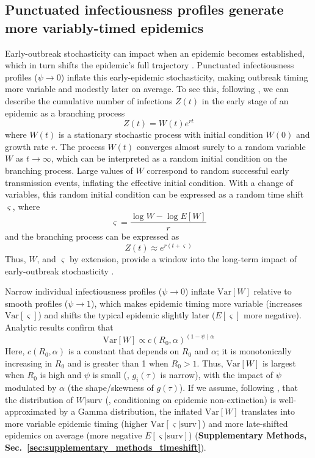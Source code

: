 \subsection{Punctuated infectiousness profiles generate more variably-timed epidemics}
\label{sec:results_time-shift}

Early-outbreak stochasticity can impact when an epidemic becomes established, which in turn shifts the epidemic's full trajectory \citep{morris_computation_2024}. Punctuated infectiousness profiles ($\psi \rightarrow 0$) inflate this early-epidemic stochasticity, making outbreak timing more variable and modestly later on average. To see this, following \citet{morris_computation_2024}, we can describe the cumulative number of infections $Z(t)$ in the early stage of an epidemic as a branching process
\begin{equation}
	Z(t) = W(t) e^{rt}
\end{equation}
where $W(t)$ is a stationary stochastic process with initial condition $W(0)$ and growth rate $r$. The process $W(t)$ converges almost surely to a random variable $W$ as $t \rightarrow \infty$, which can be interpreted as a random initial condition on the branching process. Large values of $W$ correspond to random successful early transmission events, inflating the effective initial condition. With a change of variables, this random initial condition can be expressed as a random time shift $\varsigma$, where 
\begin{equation}
	\varsigma = \frac{\log W - \log E[W]}{r}
\end{equation}
and the branching process can be expressed as 
\begin{equation}
	Z(t) \approx e^{r(t + \varsigma)}
\end{equation}
Thus, $W$, and $\varsigma$ by extension, provide a window into the long-term impact of early-outbreak stochasticity \citep{morris_computation_2024}. 

Narrow individual infectiousness profiles ($\psi \rightarrow 0$) inflate $\text{Var}[W]$ relative to smooth profiles ($\psi \rightarrow 1$), which makes epidemic timing more variable (increases $\text{Var}[\varsigma]$) and shifts the typical epidemic slightly later ($E[\varsigma]$ more negative). Analytic results confirm that 
\begin{equation}
	\text{Var}[W] \propto c(R_0, \alpha)^{(1-\psi)\alpha}
\end{equation}
Here, $c(R_0, \alpha)$ is a constant that depends on $R_0$ and $\alpha$; it is monotonically increasing in $R_0$ and is greater than 1 when $R_0 > 1$. Thus, $\text{Var}[W]$ is largest when $R_0$ is high and $\psi$ is small (\ie, $g_i(\tau)$ is narrow), with the impact of $\psi$ modulated by $\alpha$ (the shape/skewness of $g(\tau)$). If we assume, following \citet{morris_computation_2024}, that the distribution of $W | \text{surv}$ (\ie, conditioning on epidemic non-extinction) is well-approximated by a Gamma distribution, the inflated $\text{Var}[W]$ translates into more variable epidemic timing (higher $\text{Var}[\varsigma | \text{surv}]$) and more late-shifted epidemics on average (more negative $E[\varsigma | \text{surv}]$) ({\bf Supplementary Methods, Sec.~\ref{sec:supplementary_methods_timeshift}}).  

